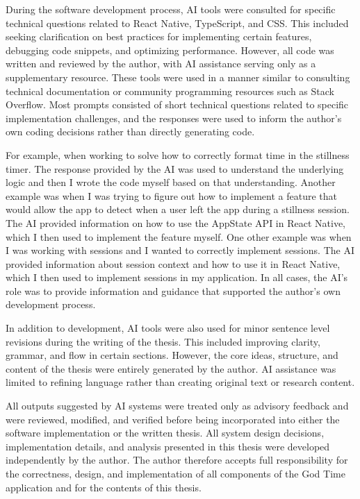 \documentclass[12pt]{article}
\begin{document}
During the software development process, AI tools were consulted for specific technical questions related to React Native, TypeScript, and CSS. This included seeking clarification on best practices for implementing certain features, debugging code snippets, and optimizing performance. However, all code was written and reviewed by the author, with AI assistance serving only as a supplementary resource. These tools
were used in a manner similar to consulting technical documentation or community
programming resources such as Stack Overflow. Most prompts consisted of short technical
questions related to specific implementation challenges, and the responses were used to inform the author's own coding decisions rather than directly generating code. 

For example, when working to solve how to correctly format time in the stillness timer. The response provided by the AI was used to understand the underlying logic and then I wrote the code myself based on that understanding. Another example was when I was trying to figure out how to implement a feature that would allow the app to detect when a user left the app during a stillness session. The AI provided information on how to use the AppState API in React Native, which I then used to implement the feature myself. One other example was when I was working with sessions and I wanted to correctly implement sessions. The AI provided information about session context and how to use it in React Native, which I then used to implement sessions in my application. In all cases, the AI's role was to provide information and guidance that supported the author's own development process.

In addition to development, AI tools were also used for minor sentence level revisions during the writing of the thesis. This included improving clarity, grammar, and flow in certain sections. However, the core ideas, structure, and content of the thesis were entirely generated by the author. AI assistance was limited to refining language rather than creating original text or research content. 

All outputs suggested by AI systems were treated only as advisory feedback and were reviewed, modified, and verified before being incorporated into either the software implementation or the written thesis. All system design decisions, implementation details, and analysis presented in this thesis were developed independently by the author. The author therefore accepts full responsibility for the correctness, design, and implementation of all components of the God Time application and for the contents of this thesis.
\end{document}
